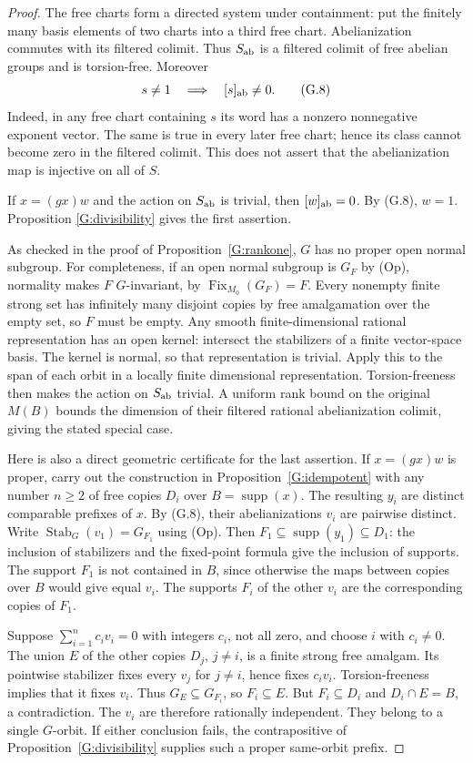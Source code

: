 \begin{proof}
The free charts form a directed system under containment: put
the finitely many basis elements of two charts into a third
free chart.  Abelianization commutes with its filtered colimit.
Thus $S_{\mathrm{ab}}$ is a filtered colimit of free abelian groups and
is torsion-free.  Moreover
\[
 s\ne1\quad\Longrightarrow\quad [s]_{\mathrm{ab}}\ne0.
 \tag{G.8}
\]
Indeed, in any free chart containing $s$ its word has a nonzero
nonnegative exponent vector.  The same is true in every later
free chart; hence its class cannot become zero in the filtered
colimit.  This does not assert that the abelianization map is
injective on all of $S$.

If $x=(gx)w$ and the action on $S_{\mathrm{ab}}$ is trivial, then
$[w]_{\mathrm{ab}}=0$.  By (G.8), $w=1$.  Proposition
\ref{G:divisibility} gives the first assertion.

As checked in the proof of Proposition~\ref{G:rankone}, $G$
has no proper open normal subgroup.  For completeness, if an
open normal subgroup is $G_F$ by (Op), normality makes $F$
$G$-invariant, by $\operatorname{Fix}_{M_0}(G_F)=F$.  Every
nonempty finite strong set has infinitely many disjoint copies
by free amalgamation over the empty set, so $F$ must be empty.
Any smooth finite-dimensional rational representation has an
open kernel: intersect the stabilizers of a finite vector-space
basis.  The kernel is normal, so that representation is trivial.
Apply this to the span of each orbit in a locally finite
dimensional representation.  Torsion-freeness then makes the
action on $S_{\mathrm{ab}}$ trivial.  A uniform rank bound on the
original $M(B)$ bounds the dimension of their filtered rational
abelianization colimit, giving the stated special case.

Here is also a direct geometric certificate for the last
assertion.  If $x=(gx)w$ is proper, carry out the construction
in Proposition~\ref{G:idempotent} with any number $n\ge2$ of
free copies $D_i$ over $B=\operatorname{supp}(x)$.
The resulting $y_i$ are distinct comparable prefixes of $x$.
By (G.8), their abelianizations $v_i$ are pairwise distinct.
Write $\operatorname{Stab}_G(v_1)=G_{F_1}$ using (Op).
Then $F_1\subseteq\operatorname{supp}(y_1)\subseteq D_1$:
the inclusion of stabilizers and the fixed-point formula give
the inclusion of supports.  The support $F_1$ is not contained
in $B$, since otherwise the maps between copies over $B$ would
give equal $v_i$.  The supports $F_i$ of the other $v_i$ are
the corresponding copies of $F_1$.

Suppose $\sum_{i=1}^n c_i v_i=0$ with integers $c_i$, not all
zero, and choose $i$ with $c_i\ne0$.  The union $E$ of the
other copies $D_j$, $j\ne i$, is a finite strong free amalgam.
Its pointwise stabilizer fixes every $v_j$ for $j\ne i$,
hence fixes $c_i v_i$.  Torsion-freeness implies that it fixes
$v_i$.  Thus $G_E\subseteq G_{F_i}$, so $F_i\subseteq E$.
But $F_i\subseteq D_i$ and $D_i\cap E=B$, a contradiction.
The $v_i$ are therefore rationally independent.  They belong
to a single $G$-orbit.  If either conclusion fails, the
contrapositive of Proposition~\ref{G:divisibility} supplies
such a proper same-orbit prefix.
\end{proof}

